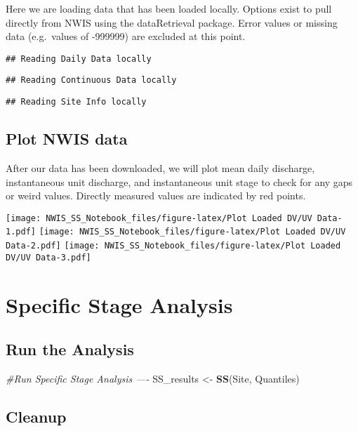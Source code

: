 \documentclass[]{article}
\newenvironment{Shaded}{\begin{snugshade}}{\end{snugshade}}
\newcommand{\KeywordTok}[1]{\textcolor[rgb]{0.13,0.29,0.53}{\textbf{#1}}}
\newcommand{\StringTok}[1]{\textcolor[rgb]{0.31,0.60,0.02}{#1}}
\newcommand{\CommentTok}[1]{\textcolor[rgb]{0.56,0.35,0.01}{\textit{#1}}}
\newcommand{\NormalTok}[1]{#1}
\begin{document}
Here we are loading data that has been loaded locally. Options exist to
pull directly from NWIS using the dataRetrieval package. Error values or
missing data (e.g.~values of -999999) are excluded at this point.

\begin{verbatim}
## Reading Daily Data locally
\end{verbatim}

\begin{verbatim}
## Reading Continuous Data locally
\end{verbatim}

\begin{verbatim}
## Reading Site Info locally
\end{verbatim}

\subsection{Plot NWIS data}\label{plot-nwis-data}

After our data has been downloaded, we will plot mean daily discharge,
instantaneous unit discharge, and instantaneous unit stage to check for
any gaps or weird values. Directly measured values are indicated by red
points.

\texttt{[image: NWIS\_SS\_Notebook\_files/figure-latex/Plot Loaded DV/UV Data-1.pdf]}
\texttt{[image: NWIS\_SS\_Notebook\_files/figure-latex/Plot Loaded DV/UV Data-2.pdf]}
\texttt{[image: NWIS\_SS\_Notebook\_files/figure-latex/Plot Loaded DV/UV Data-3.pdf]}

\section{Specific Stage Analysis}\label{specific-stage-analysis}

\subsection{Run the Analysis}\label{run-the-analysis}

\begin{Shaded}
\begin{Highlighting}[]
\CommentTok{#Run Specific Stage Analysis ----}
\NormalTok{SS_results <-}\StringTok{ }\KeywordTok{SS}\NormalTok{(Site, Quantiles)}
\end{Highlighting}
\end{Shaded}

\subsection{Cleanup}\label{cleanup}
\end{document}
